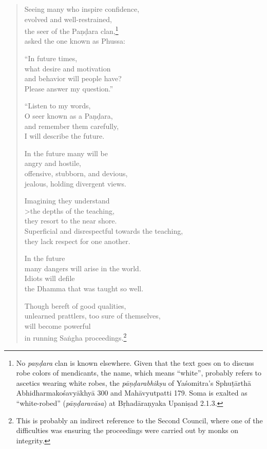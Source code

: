 \documentclass[12pt,openany]{book}%
\begin{document}
\begin{verse}%
Seeing many who inspire confidence, \\
evolved and well-restrained, \\
the seer of the \textsanskrit{Paṇḍara} clan,\footnote{No \textit{\textsanskrit{paṇḍara}} clan is known elsewhere. Given that the text goes on to discuss robe colors of mendicants, the name, which means “white”, probably refers to ascetics wearing white robes, the \textit{\textsanskrit{pāṇḍarabhikṣu}} of Yaśomitra’s \textsanskrit{Sphuṭārthā} \textsanskrit{Abhidharmakośavyākhyā} 300 and \textsanskrit{Mahāvyutpatti} 179. Soma is exalted as “white-robed” (\textit{\textsanskrit{pāṇḍaravāsa}}) at \textsanskrit{Bṛhadāraṇyaka} \textsanskrit{Upaniṣad} 2.1.3. } \\
asked the one known as Phussa: 

“In future times, \\
what desire and motivation \\
and behavior will people have? \\
Please answer my question.” 

“Listen to my words, \\
O seer known as a \textsanskrit{Paṇḍara}, \\
and remember them carefully, \\
I will describe the future. 

In the future many will be \\
angry and hostile, \\
offensive, stubborn, and devious, \\
jealous, holding divergent views. 

Imagining they understand \\>the depths of the teaching, \\
they resort to the near shore. \\
Superficial and disrespectful towards the teaching, \\
they lack respect for one another. 

In the future \\
many dangers will arise in the world. \\
Idiots will defile \\
the Dhamma that was taught so well. 

Though bereft of good qualities, \\
unlearned prattlers, too sure of themselves, \\
will become powerful \\
in running \textsanskrit{Saṅgha} proceedings.\footnote{This is probably an indirect reference to the Second Council, where one of the difficulties was ensuring the proceedings were carried out by monks on integrity. } 


\end{verse}
\end{document}
